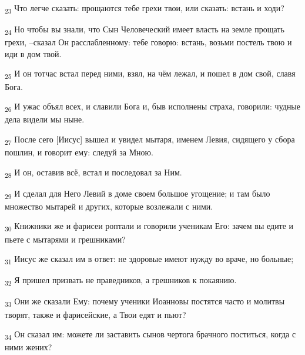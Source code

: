 \begin{tcolorbox}
\textsubscript{23} Что легче сказать: прощаются тебе грехи твои, или сказать: встань и ходи?
\end{tcolorbox}
\begin{tcolorbox}
\textsubscript{24} Но чтобы вы знали, что Сын Человеческий имеет власть на земле прощать грехи, --сказал Он расслабленному: тебе говорю: встань, возьми постель твою и иди в дом твой.
\end{tcolorbox}
\begin{tcolorbox}
\textsubscript{25} И он тотчас встал перед ними, взял, на чём лежал, и пошел в дом свой, славя Бога.
\end{tcolorbox}
\begin{tcolorbox}
\textsubscript{26} И ужас объял всех, и славили Бога и, быв исполнены страха, говорили: чудные дела видели мы ныне.
\end{tcolorbox}
\begin{tcolorbox}
\textsubscript{27} После сего [Иисус] вышел и увидел мытаря, именем Левия, сидящего у сбора пошлин, и говорит ему: следуй за Мною.
\end{tcolorbox}
\begin{tcolorbox}
\textsubscript{28} И он, оставив всё, встал и последовал за Ним.
\end{tcolorbox}
\begin{tcolorbox}
\textsubscript{29} И сделал для Него Левий в доме своем большое угощение; и там было множество мытарей и других, которые возлежали с ними.
\end{tcolorbox}
\begin{tcolorbox}
\textsubscript{30} Книжники же и фарисеи роптали и говорили ученикам Его: зачем вы едите и пьете с мытарями и грешниками?
\end{tcolorbox}
\begin{tcolorbox}
\textsubscript{31} Иисус же сказал им в ответ: не здоровые имеют нужду во враче, но больные;
\end{tcolorbox}
\begin{tcolorbox}
\textsubscript{32} Я пришел призвать не праведников, а грешников к покаянию.
\end{tcolorbox}
\begin{tcolorbox}
\textsubscript{33} Они же сказали Ему: почему ученики Иоанновы постятся часто и молитвы творят, также и фарисейские, а Твои едят и пьют?
\end{tcolorbox}
\begin{tcolorbox}
\textsubscript{34} Он сказал им: можете ли заставить сынов чертога брачного поститься, когда с ними жених?
\end{tcolorbox}
